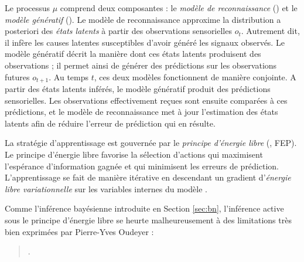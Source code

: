 Le processus $\mu$ comprend deux composantes : le \emph{modèle de reconnaissance} () et le \emph{modèle génératif} ().
Le modèle de reconnaissance approxime la distribution a posteriori des \emph{états latents} à partir des observations sensorielles $o_t$. 
Autrement dit, il infère les causes latentes susceptibles d’avoir généré les signaux observés.
Le modèle génératif décrit la manière dont ces états latents produisent des observations ; il permet ainsi de générer des prédictions sur les observations futures  $o_{t+1}$.
Au temps $t$, ces deux modèles fonctionnent de manière conjointe. 
A partir des états latents inférés, le modèle génératif produit des prédictions sensorielles. Les observations effectivement reçues sont ensuite comparées à ces prédictions, et le modèle de reconnaissance met à jour l’estimation des états latents afin de réduire l’erreur de prédiction qui en résulte.



La stratégie d'apprentissage est gouvernée par le \emph{principe d'énergie libre} (, FEP).
Le principe d'énergie libre favorise la sélection d'actions qui maximisent l'espérance d'information gagnée et qui minimisent les erreurs de prédiction.
L'apprentissage se fait de manière itérative en descendant un gradient d'\emph{énergie libre variationnelle} sur les variables internes du modèle \cite{smith_step-by-step_2022} . 


Comme l'inférence bayésienne introduite en Section \ref{sec:bn}, l'inférence active sous le principe d'énergie libre se heurte malheureusement à des limitations très bien exprimées par Pierre-Yves Oudeyer :

\begin{quote}
	\cite[p.~9]{oudeyer_computational_2018}.
\end{quote}

